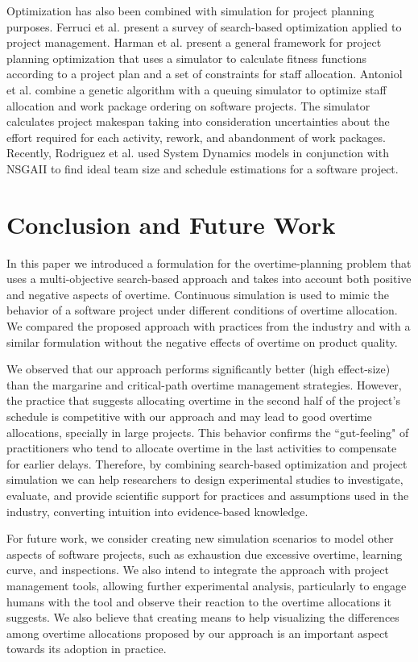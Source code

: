 \documentclass[conference]{IEEEtran}
\begin{document}
Optimization has also been combined with simulation for project planning purposes. Ferruci et al. \cite{ferrucci:2014} present a survey of search-based optimization applied to project management. Harman et al. \cite{harman:2009} present a general framework for project planning optimization that uses a simulator to calculate fitness functions according to a project plan and a set of constraints for staff allocation. Antoniol et al. \cite{Antoniol:2004} combine a genetic algorithm with a queuing simulator to optimize staff allocation and work package ordering on software projects. The simulator calculates project makespan taking into consideration uncertainties about the effort required for each activity, rework, and abandonment of work packages. Recently, Rodriguez et al. \cite{Rodriguez:2011} used System Dynamics models in conjunction with NSGAII to find ideal team size and schedule estimations for a software project.

\section{Conclusion and Future Work}

In this paper we introduced a formulation for the overtime-planning problem that uses a multi-objective search-based approach and takes into account both positive and negative aspects of overtime. Continuous simulation is used to mimic the behavior of a software project under different conditions of overtime allocation. We compared the proposed approach with practices from the industry and with a similar formulation without the negative effects of overtime on product quality. 

We observed that our approach performs significantly better (high effect-size) than the margarine and critical-path overtime management strategies. However, the practice that suggests allocating overtime in the second half of the project's schedule is competitive with our approach and may lead to good overtime allocations, specially in large projects. This behavior confirms the ``gut-feeling" of practitioners who tend to allocate overtime in the last activities to compensate for earlier delays. Therefore, by combining search-based optimization and project simulation we can help researchers to design experimental studies to investigate, evaluate, and provide scientific support for practices and assumptions used in the industry, converting intuition into evidence-based knowledge. 

For future work, we consider creating new simulation scenarios to model other aspects of software projects, such as exhaustion due excessive overtime, learning curve, and inspections. We also intend to integrate the approach with project management tools, allowing further experimental analysis, particularly to engage humans with the tool and observe their reaction to the overtime allocations it suggests. We also believe that creating means to help visualizing the differences among overtime allocations proposed by our approach is an important aspect towards its adoption in practice.




\end{document}
